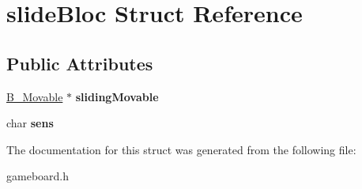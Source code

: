 \hypertarget{structslide_bloc}{}\section{slide\+Bloc Struct Reference}
\label{structslide_bloc}
\subsection*{Public Attributes}
\begin{DoxyCompactItemize}
\item 
\hypertarget{structslide_bloc_a6fc7a4aca79032561e6d86f04b408695}{}\hyperlink{class_b___movable}{B\+\_\+\+Movable} $\ast$ {\bfseries sliding\+Movable}\label{structslide_bloc_a6fc7a4aca79032561e6d86f04b408695}

\item 
\hypertarget{structslide_bloc_adddf09c54543b518c768c0499f2db8b3}{}char {\bfseries sens}\label{structslide_bloc_adddf09c54543b518c768c0499f2db8b3}

\end{DoxyCompactItemize}


The documentation for this struct was generated from the following file\+:\begin{DoxyCompactItemize}
\item 
gameboard.\+h\end{DoxyCompactItemize}
